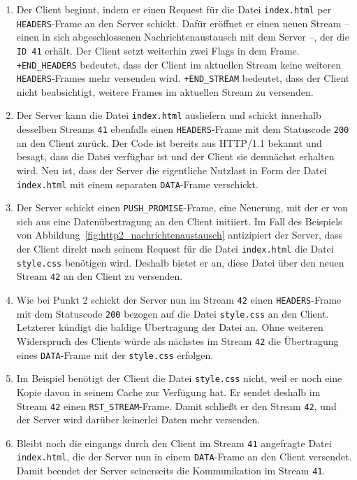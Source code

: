 \documentclass[a4paper, justified, notoc]{tufte-handout} %
\begin{document}
\begin{enumerate}
	\item Der Client beginnt, indem er einen Request für die Datei \texttt{index.html} per \texttt{HEADERS}-Frame an den Server schickt. Dafür eröffnet er einen neuen Stream -- einen in sich abgeschlossenen Nachrichtenaustausch mit dem Server --, der die \texttt{ID 41} erhält. Der Client setzt weiterhin zwei Flags in dem Frame. \texttt{+END\_HEADERS} bedeutet, dass der Client im aktuellen Stream keine weiteren \texttt{HEADERS}-Frames mehr versenden wird. \texttt{+END\_STREAM} bedeutet, dass der Client nicht beabsichtigt, weitere Frames im aktuellen Stream zu versenden.
	\item Der Server kann die Datei \texttt{index.html} ausliefern und schickt innerhalb desselben Streams \texttt{41} ebenfalls einen \texttt{HEADERS}-Frame mit dem Statuscode \texttt{200} an den Client zurück. Der Code ist bereits aus HTTP/1.1 bekannt und besagt, dass die Datei verfügbar ist und der Client sie demnächst erhalten wird. Neu ist, dass der Server die eigentliche Nutzlast in Form der Datei \texttt{index.html} mit einem separaten \texttt{DATA}-Frame verschickt.
	\item Der Server schickt einen \texttt{PUSH\_PROMISE}-Frame, eine Neuerung, mit der er von sich aus eine Datenübertragung an den Client initiiert. Im Fall des Beispiels von Abbildung~\ref{fig:http2_nachrichtenaustausch} antizipiert der Server, dass der Client direkt nach seinem Request für die Datei \texttt{index.html} die Datei \texttt{style.css} benötigen wird. Deshalb bietet er an, diese Datei über den neuen Stream \texttt{42} an den Client zu versenden.
	\item Wie bei Punkt 2 schickt der Server nun im Stream \texttt{42} einen \texttt{HEADERS}-Frame mit dem Statuscode \texttt{200} bezogen auf die Datei \texttt{style.css} an den Client. Letzterer kündigt die baldige Übertragung der Datei an. Ohne weiteren Widerspruch des Clients würde als nächstes im Stream \texttt{42} die Übertragung eines \texttt{DATA}-Frame mit der \texttt{style.css} erfolgen.
	\item Im Beispiel benötigt der Client die Datei \texttt{style.css} nicht, weil er noch eine Kopie davon in seinem Cache zur Verfügung hat. Er sendet deshalb im Stream \texttt{42} einen \texttt{RST\_STREAM}-Frame. Damit schließt er den Stream \texttt{42}, und der Server wird darüber keinerlei Daten mehr versenden.
	\item Bleibt noch die eingangs durch den Client im Stream \texttt{41} angefragte Datei \texttt{index.html}, die der Server nun in einem \texttt{DATA}-Frame an den Client versendet. Damit beendet der Server seinerseits die Kommunikation im Stream \texttt{41}.
\end{enumerate}
\end{document}
